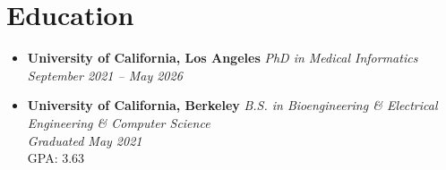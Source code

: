 \section*{Education}

\begin{itemize}
    \item \textbf{University of California, Los Angeles} \hfill \textit{PhD in Medical Informatics} \\
    \textit{September 2021 -- May 2026} \\
    
    \item \textbf{University of California, Berkeley} \hfill \textit{B.S. in Bioengineering \& Electrical Engineering \& Computer Science} \\
    \textit{Graduated May 2021} \\
    GPA: 3.63 \\
\end{itemize}